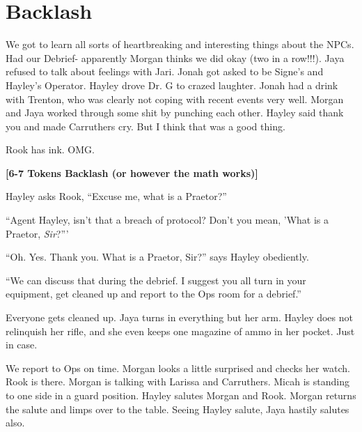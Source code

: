\setcounter{chapter}{ 30 }


\chapter{\textbf{Backlash} }






We got to learn all sorts of heartbreaking and interesting things about the NPCs.  Had our Debrief- apparently Morgan thinks we did okay (two in a row!!!).  Jaya refused to talk about feelings with Jari.  Jonah got asked to be Signe's and Hayley's Operator.  Hayley drove Dr. G to crazed laughter.  Jonah had a drink with Trenton, who was clearly not coping with recent events very well.  Morgan and Jaya worked through some shit by punching each other.  Hayley said thank you and made Carruthers cry.  But I think that was a good thing.



Rook has ink.  OMG.






\textbf{{[}6-7 Tokens Backlash (or however the math works){]}}

Hayley asks Rook, ``Excuse me, what is a Praetor?''

``Agent Hayley, isn't that a breach of protocol?  Don't you mean, 'What is a Praetor, \textit{Sir}?'''

``Oh.  Yes.  Thank you.  What is a Praetor, Sir?'' says Hayley obediently.

``We can discuss that during the debrief.  I suggest you all turn in your equipment, get cleaned up and report to the Ops room for a debrief.''



Everyone gets cleaned up.  Jaya turns in everything but her arm.  Hayley does not relinquish her rifle, and she even keeps one magazine of ammo in her pocket.  Just in case.



We report to Ops on time.  Morgan looks a little surprised and checks her watch.  Rook is there.  Morgan is talking with Larissa and Carruthers.  Micah is standing to one side in a guard position.  Hayley salutes Morgan and Rook.  Morgan returns the salute and limps over to the table.  Seeing Hayley salute, Jaya hastily salutes also.



